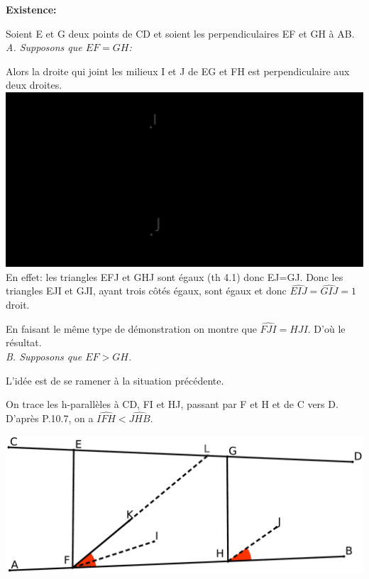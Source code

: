 \documentclass[a4paper, 12pt, twoside]{book}
\begin{document}
 \textbf{Existence:} \
 
 Soient E et G deux points de CD et soient les perpendiculaires EF et GH à AB.\\
 
 \textit{A. Supposons que $EF=GH$:}\
 
 Alors la droite qui joint les milieux I et J de EG et FH est perpendiculaire aux deux droites.\\
 
 
 \includegraphics[scale=0.1]{figures/Lobat27.eps}\\ 
 
 En effet: les triangles EFJ et GHJ sont égaux (th 4.1) donc EJ=GJ. Donc les triangles EJI et GJI, ayant trois côtés égaux, sont égaux et donc $\hat{EIJ}=\hat{GIJ}=1$ droit.\
 
 En faisant le même type de démonstration on montre que $\hat{FJI}=\hat{HJI}$. D'où le résultat.\\
 
 \textit{B. Supposons que $EF>GH$.}\
 
 L'idée est de se ramener à la situation précédente.\
 
 On trace les h-parallèles à CD, FI et HJ, passant par F et H et de C vers D. D'après P.10.7, on a $\hat{IFH}<\hat{JHB}$.\
 
 
  \includegraphics[scale=0.1]{figures/Lobat28.eps}\\ 
  
\end{document}
